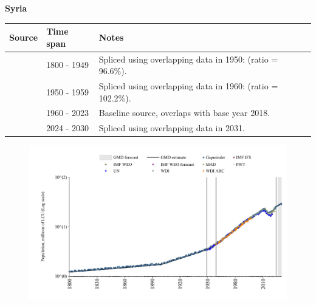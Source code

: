 \documentclass[12pt,a4paper,landscape]{article}
\begin{document}
\begin{adjustbox}{max totalsize={\paperwidth}{\paperheight},center}
\begin{minipage}[t][\textheight][t]{\textwidth}
\vspace*{0.5cm}
{}
\begin{center}
{\Large\bfseries Syria}
\end{center}
\vspace{0.5cm}
\begin{table}[H]
\centering
\small
\begin{tabular}{|l|l|l|}
\hline
\textbf{Source} & \textbf{Time span} & \textbf{Notes} \\
\hline
\rowcolor{white}\cite{Gapminder}& 1800 - 1949 &Spliced using overlapping data in 1950: (ratio = 96.6\%).\\
\rowcolor{lightgray}\cite{IMF_IFS}& 1950 - 1959 &Spliced using overlapping data in 1960: (ratio = 102.2\%).\\
\rowcolor{white}\cite{WDI}& 1960 - 2023 &Baseline source, overlaps with base year 2018.\\
\rowcolor{lightgray}\cite{Gapminder}& 2024 - 2030 &Spliced using overlapping data in 2031.\\
\hline
\end{tabular}
\end{table}
\begin{figure}[H]
\centering
\includegraphics[width=\textwidth,height=0.6\textheight,keepaspectratio]{graphs/SYR_pop.pdf}
\end{figure}
\end{minipage}
\end{adjustbox}
\end{document}
